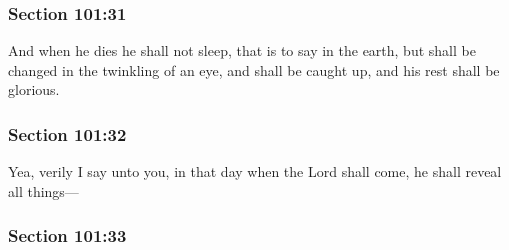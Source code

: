 
	\subsubsection{Section 101:31} %
		\label{DC101-31}

		And when he dies he shall not sleep, that is to say in the earth, but shall be changed in the twinkling of an eye, and shall be caught up, and his rest shall be glorious.


	\subsubsection{Section 101:32} %
		\label{DC101-32}

		Yea, verily I say unto you, in that day when the Lord shall come, he shall reveal all things---


	\subsubsection{Section 101:33} %
		\label{DC101-33}

